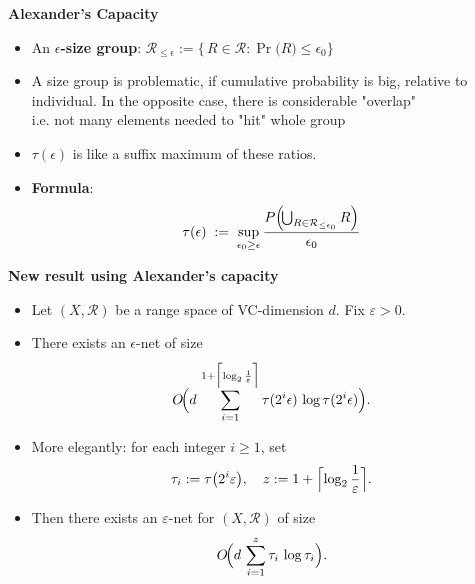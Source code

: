 \documentclass{beamer}
\begin{document}
\begin{frame}{\textbf{Alexander's Capacity}}
    \begin{itemize}
        \item An \textbf{$\epsilon$-size group}: \( \mathcal{R}_{\leq \epsilon} := \{\,R \in \mathcal{R} : \Pr \bigl(R \bigr)\le \epsilon_0 \} \)
        \vspace{0.2cm}
        \item A size group is problematic, if cumulative probability is big, relative to individual. In the opposite case, there is considerable "overlap" \\i.e. not many elements needed to "hit" whole group
        \vspace{0.2cm}
        \item \( \tau(\epsilon)\) is like a suffix maximum of these ratios.
        \vspace{0.2cm}
        \item \textbf{Formula}:
        \[
\tau(\epsilon) \;:=\; 
\sup_{\epsilon_0 \ge \epsilon}
\frac{
  P\Bigl(\!\bigcup_{R \in \mathcal{R}_{\le \epsilon_0}} R\Bigr)
}{\epsilon_0}
\]
    \end{itemize}
\end{frame}

\begin{frame}{\textbf{New result using Alexander’s capacity}}
\begin{itemize}
    \item  Let $(X,\mathcal{R})$ be a range space of VC-dimension $d$.  Fix $\varepsilon>0$.
    \item  There exists an $\epsilon$-net of size\\
  \[O\!\Bigl(d\,\sum_{i=1}^{1 + \Bigl\lceil \log_2\frac{1}{\varepsilon}\Bigr\rceil} \tau(2^i\epsilon)\,\log\tau(2^i\epsilon)\Bigr).\]
  \vspace{0.2cm}
    \item More elegantly: for each integer $i\ge1$, set
  \begin{equation*}
    \tau_i := \tau\bigl(2^i\varepsilon\bigr),
    \quad
    z := 1 + \Bigl\lceil \log_2\frac{1}{\varepsilon}\Bigr\rceil.
  \end{equation*}
  \item Then there exists an $\varepsilon$-net for $(X,\mathcal{R})$ of size
  \begin{equation*}
    O\!\Bigl(d\,\sum_{i=1}^{z} \tau_i\,\log\tau_i\Bigr).
  \end{equation*}
\end{itemize}
  
\end{frame}
\end{document}
